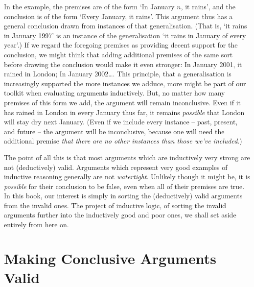 In the example, the premises are of the form `In January $n$, it rains', and the conclusion is of the form `Every January, it rains'. This argument thus has a general conclusion drawn from instances of that generalisation. (That is, `it rains in January 1997' is an instance of the generalisation `it rains in January of every year'.) If we regard the foregoing premises as providing decent support for the conclusion, we might think that adding additional premises of the same sort before drawing the conclusion would make it even stronger: In January 2001, it rained in London; In January 2002\ldots. This principle, that a generalisation is increasingly supported the more instances we adduce, more might be part of our toolkit when evaluating arguments inductively. But, no matter how many premises of this form we add, the argument will remain inconclusive. Even if it has rained in London in every January thus far, it remains \emph{possible} that London will stay dry next January. (Even if we include every instance – past, present, and future – the argument will be inconclusive, because one will need the additional premise \emph{that there are no other instances than those we've included}.)

The point of all this is that most arguments which are inductively very strong are not (deductively) valid. Arguments which represent very good examples of inductive reasoning generally are not \emph{watertight}. Unlikely though it might be, it is \emph{possible} for their conclusion to be false, even when all of their premises are true. In this book, our interest is simply in sorting the (deductively) valid arguments from the invalid ones. The project of inductive logic, of sorting the invalid arguments further into the inductively good and poor ones, we shall set aside entirely from here on. 



\section{Making Conclusive Arguments Valid} %


